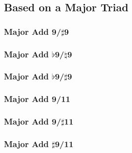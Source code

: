 \documentclass[english]{./gbook}
\begin{document}
\begin{large}
\subsection{Based on a Major Triad}

\subsubsection{Major Add 9/$\sharp$9}

\subsubsection{Major Add $\flat$9/$\natural$9}

\subsubsection{Major Add $\flat$9/$\sharp$9}

\subsubsection{Major Add 9/11}

\subsubsection{Major Add 9/$\sharp$11}

\subsubsection{Major Add $\sharp$9/11}


\end{large}
\end{document}
